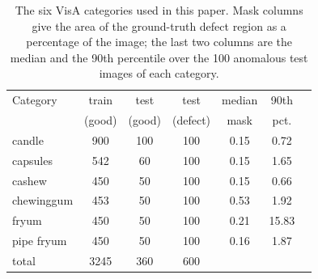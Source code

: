 \begin{table}[t]
\centering
\small
\setlength{\tabcolsep}{4pt}
\begin{tabular}{lcccccc}
\toprule
Category & train & test & test & median & 90th \\
 & (good) & (good) & (defect) & mask & pct. \\
\midrule
candle & 900 & 100 & 100 & 0.15 & 0.72 \\
capsules & 542 & 60 & 100 & 0.15 & 1.65 \\
cashew & 450 & 50 & 100 & 0.15 & 0.66 \\
chewinggum & 453 & 50 & 100 & 0.53 & 1.92 \\
fryum & 450 & 50 & 100 & 0.21 & 15.83 \\
pipe fryum & 450 & 50 & 100 & 0.16 & 1.87 \\
\midrule
total & 3245 & 360 & 600 & & \\
\bottomrule
\end{tabular}
\caption{The six VisA categories used in this paper. Mask columns give the area of the ground-truth defect region as a percentage of the image; the last two columns are the median and the 90th percentile over the 100 anomalous test images of each category.}
\label{tab:dataset}
\end{table}